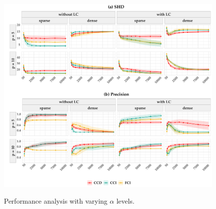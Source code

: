 \documentclass[twoside, 11pt]{article}
\begin{document}
\begin{appendices}
\begin{figure}[!htb]
    \centering
        \caption{Performance analysis  with varying $\alpha$ levels.}
        \includegraphics[width=1\textwidth]{figures/varyingalpha_result1.pdf}
    \label{fig:H1}
\end{figure}


\end{appendices}
\end{document}
